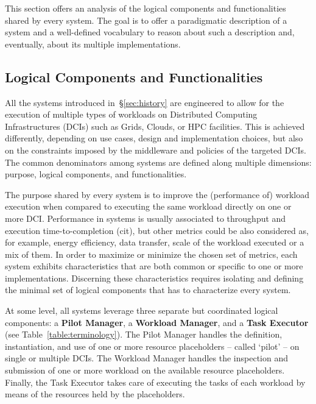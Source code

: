 \documentclass{sig-alternate}
\begin{document}
This section offers an analysis of the logical components and functionalities
shared by every \pilot system. The goal is to offer a paradigmatic description
of a \pilot system and a well-defined vocabulary to reason about such a
description and, eventually, about its multiple implementations.

\subsection{Logical Components and Functionalities}
\label{sec:compsandfuncs}

All the \pilot systems introduced in~\S\ref{sec:history} are engineered
to allow for the execution of multiple types of workloads on Distributed
Computing Infrastructures (DCIs) such as Grids, Clouds, or HPC
facilities. This is achieved differently, depending on use cases, design
and implementation choices, but also on the constraints imposed by the
middleware and policies of the targeted DCIs. The common denominators
among \pilot systems are defined along multiple dimensions: purpose,
logical components, and functionalities.

The purpose shared by every \pilot system is to improve the (performance of)
workload execution when compared to executing the same workload directly on one
or more DCI. Performance in \pilot systems is usually associated to throughput
and execution time-to-completion (cit), but other metrics could be also
considered as, for example, energy efficiency, data transfer, scale of the
workload executed or a mix of them. In order to maximize or minimize the chosen
set of metrics, each \pilot system exhibits characteristics that are both
common or specific to one or more implementations. Discerning these
characteristics requires isolating and defining the minimal set of logical
components that has to characterize every \pilot system.

At some level, all \pilot systems leverage three separate but
coordinated logical components: a \textbf{Pilot Manager}, a
\textbf{Workload Manager}, and a \textbf{Task Executor} (see
Table~\ref{table:terminology}). The Pilot Manager handles the
definition, instantiation, and use of one or more resource placeholders
-- called `pilot' -- on single or multiple DCIs. The Workload Manager
handles the inspection and submission of one or more workload on the
available resource placeholders. Finally, the Task Executor takes
care of executing the tasks of each workload by means of the
resources held by the placeholders.
\end{document}
